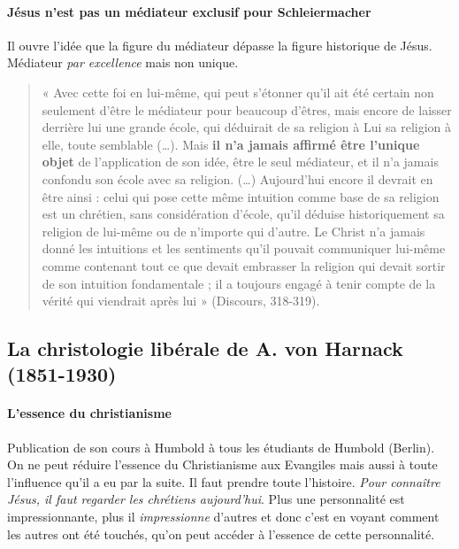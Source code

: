 \paragraph{Jésus n'est pas un médiateur exclusif pour Schleiermacher} Il ouvre l'idée que la figure du médiateur dépasse la figure historique de Jésus. Médiateur \textit{par excellence} mais non unique.

\begin{quote}
    « Avec cette foi en lui-même, qui peut s’étonner qu’il ait été certain non seulement d’être le médiateur pour beaucoup d’êtres, mais encore de laisser derrière lui une grande école, qui déduirait de sa religion à Lui sa religion à elle, toute semblable (…). Mais \textbf{il n’a jamais affirmé être l’unique objet} de l’application de son idée, être le seul médiateur, et il n’a jamais confondu son école avec sa religion. (…) Aujourd’hui encore il devrait en être ainsi : celui qui pose cette même intuition comme base de sa religion est un chrétien, sans considération d’école, qu’il déduise historiquement sa religion de lui-même ou de n’importe qui d’autre. Le Christ n’a jamais donné les intuitions et les sentiments qu’il pouvait communiquer lui-même comme contenant tout ce que devait embrasser la religion qui devait sortir de son intuition fondamentale ; il a toujours engagé à tenir compte de la vérité qui viendrait après lui » (Discours, 318-319).
\end{quote}

\subsection{La christologie libérale de A. von Harnack (1851-1930)}  
\paragraph{L’essence du christianisme} 
Publication de son cours à Humbold à tous les étudiants de Humbold (Berlin).  
On ne peut réduire l'essence du Christianisme aux Evangiles mais aussi à toute l'influence qu'il a eu par la suite. Il faut prendre toute l'histoire. \textit{Pour connaître Jésus, il faut regarder les chrétiens aujourd'hui}.
Plus une personnalité est impressionnante, plus il \textit{impressionne} d'autres et donc c'est en voyant comment les autres ont été touchés, qu'on peut accéder à l'essence de cette personnalité.



